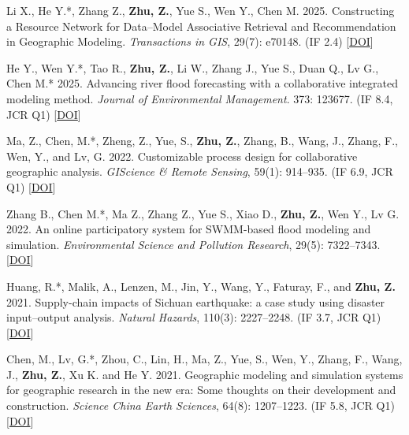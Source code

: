 \documentclass[a4paper,11pt]{article}
\begin{document}
\begin{etaremune}[leftmargin=0.3in]
    \vspace{1pt} \item Li X., He Y.*, Zhang Z., \textbf{Zhu, Z.}, Yue S., Wen Y., Chen M. 2025. Constructing a Resource Network for Data--Model Associative Retrieval and Recommendation in Geographic Modeling. \textit{Transactions in GIS}, 29(7): e70148. (IF 2.4) [\href{https://doi.org/10.1111/tgis.70148}{DOI}]

    \vspace{1pt} \item He Y., Wen Y.*, Tao R., \textbf{Zhu, Z.}, Li W., Zhang J., Yue S., Duan Q., Lv G., Chen M.* 2025. Advancing river flood forecasting with a collaborative integrated modeling method. \textit{Journal of Environmental Management}. 373: 123677. (IF 8.4, JCR Q1) [\href{https://www.sciencedirect.com/science/article/abs/pii/S0301479724036636}{DOI}]

    \vspace{1pt} \item Ma, Z., Chen, M.*, Zheng, Z., Yue, S., \textbf{Zhu, Z.}, Zhang, B., Wang, J., Zhang, F., Wen, Y., and Lv, G. 2022. Customizable process design for collaborative geographic analysis. \textit{GIScience \& Remote Sensing}, 59(1): 914--935. (IF 6.9, JCR Q1) [\href{https://doi.org/10.1080/15481603.2022.2072625}{DOI}]

    \vspace{1pt} \item Zhang B., Chen M.*, Ma Z., Zhang Z., Yue S., Xiao D., \textbf{Zhu, Z.}, Wen Y., Lv G. 2022. An online participatory system for SWMM-based flood modeling and simulation. \textit{Environmental Science and Pollution Research}, 29(5): 7322--7343. [\href{https://doi.org/10.1007/s11356-021-16120-6}{DOI}]

    \vspace{1pt} \item Huang, R.*, Malik, A., Lenzen, M., Jin, Y., Wang, Y., Faturay, F., and \textbf{Zhu, Z.} 2021. Supply-chain impacts of Sichuan earthquake: a case study using disaster input--output analysis. \textit{Natural Hazards}, 110(3): 2227--2248. (IF 3.7, JCR Q1) [\href{https://doi.org/10.1007/s11069-021-05034-8}{DOI}]

     \vspace{1pt} \item Chen, M., Lv, G.*, Zhou, C., Lin, H., Ma, Z., Yue, S., Wen, Y., Zhang, F., Wang, J., \textbf{Zhu, Z.}, Xu K. and He Y. 2021. Geographic modeling and simulation systems for geographic research in the new era: Some thoughts on their development and construction. \textit{Science China Earth Sciences}, 64(8): 1207--1223. (IF 5.8, JCR Q1) [\href{https://doi.org/10.1007/s11430-020-9759-0}{DOI}]


\end{etaremune}
\end{document}
